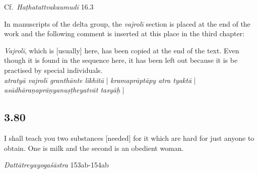 \begin{ekdosis}
\begin{testimonia}[hp03_079]
Cf.~\emph{Haṭhatattvakaumudī} 16.3
\begin{versinnote}
\end{versinnote}


\end{testimonia}

\begin{philcomm}[hp03_079]
In manuscripts of the delta group, the \emph{vajrolī} section is placed at the end of the work and the following comment is inserted at this place in the third chapter:
\begin{versinnote}
\emph{Vajrolī}, which is [usually] here, has been copied at the end of the text. Even though it is found in the sequence here, it has been left out because it is be practised by special individuals.\\
\emph{atratyā vajrolī granthānte likhitā} | \emph{kramaprāptāpy atra tyaktā} | \emph{asādhāraṇaprāṇyanuṣṭheyatvāt tasyāḥ} |
\end{versinnote}

\end{philcomm}


\subsection*{3.80}
\begin{translation}[hp03_080]
I shall teach you two substances [needed] for it which are hard for just anyone to obtain. One is milk and the second is an obedient woman.
\end{translation}

\begin{sources}[hp03_080]
\emph{Dattātreyayogaśāstra} 153ab-154ab
\begin{versinnote}
\end{versinnote}
\end{sources}


\end{ekdosis}
